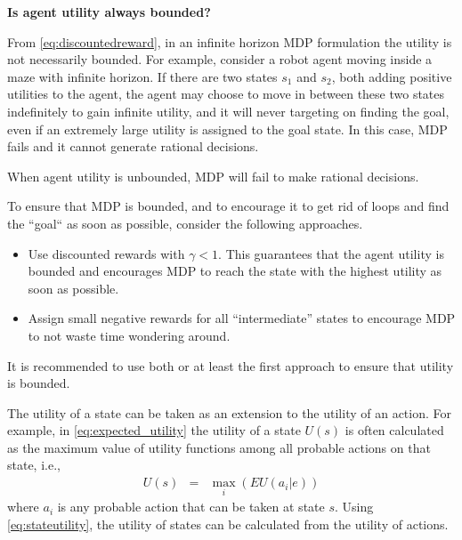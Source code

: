 \begin{mdframed}
\noindent \textbf{Is agent utility always bounded?}

From \eqref{eq:discountedreward}, in an infinite horizon MDP formulation the utility is not necessarily bounded. For example, consider a robot agent moving inside a maze with infinite horizon. If there are two states $s_1$ and $s_2$, both adding positive utilities to the agent, the agent may choose to move in between these two states indefinitely to gain infinite utility, and it will never targeting on finding the goal, even if an extremely large utility is assigned to the goal state. In this case, MDP fails and it cannot generate rational decisions.

When agent utility is unbounded, MDP will fail to make rational decisions.

To ensure that MDP is bounded, and to encourage it to get rid of loops and find the ``goal`` as soon as possible, consider the following approaches.
\begin{itemize}
	\item Use discounted rewards with $\gamma < 1$. This guarantees that the agent utility is bounded and encourages MDP to reach the state with the highest utility as soon as possible.
	\item Assign small negative rewards for all ``intermediate'' states to encourage MDP to not waste time wondering around. 
\end{itemize}

It is recommended to use both or at least the first approach to ensure that utility is bounded.

\end{mdframed}




















The utility of a state can be taken as an extension to the utility of an action. For example, in \eqref{eq:expected_utility} the utility of a state $U(s)$ is often calculated as the maximum value of utility functions among all probable actions on that state, i.e.,
\begin{eqnarray}
	U(s) &=& \max_i \left(EU(a_i|e)\right) \label{eq:stateutility}
\end{eqnarray}
where $a_i$ is any probable action that can be taken at state $s$. Using \eqref{eq:stateutility}, the utility of states can be calculated from the utility of actions.

